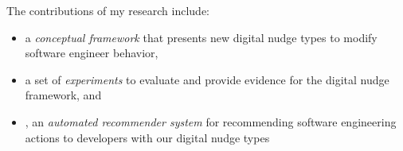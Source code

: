 The contributions of my research include:

\begin{itemize}
    \item a \textit{conceptual framework} that presents new digital nudge types to modify software engineer behavior,
    \item a set of \textit{experiments} to evaluate and provide evidence for the digital nudge framework, and
    \item \TOOL, an \textit{automated recommender system} for recommending software engineering actions to developers with our digital nudge types
\end{itemize}

